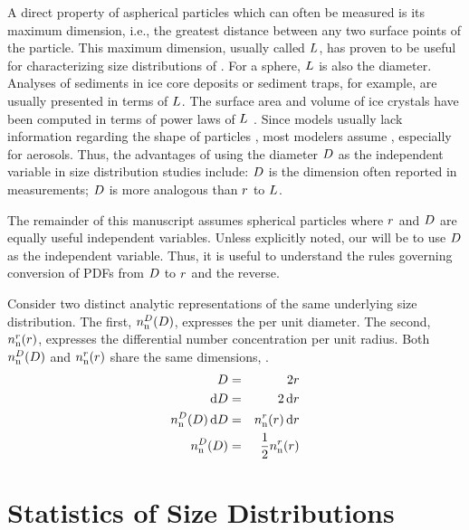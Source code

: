 \documentclass[12pt,twoside]{article}
\begin{document}
A direct property of aspherical particles which can often be measured
is its maximum dimension, i.e., the greatest distance between any two
surface points of the particle.
This maximum dimension, usually called $L$, has proven to be
useful for characterizing size distributions of 
. 
For a sphere, $L$ is also the diameter.
Analyses of  sediments in ice core deposits or sediment
traps, for example, are usually presented in terms of $L$.
The surface area and volume of ice crystals have been computed in terms
of power laws of $L$ \cite[e.g.,][]{HeP84,TaL95}.
Since models usually lack information regarding the shape of
particles \cite[early exceptions include][]{Zek941,ChL941}, most modelers
assume , especially for aerosols.
Thus, the advantages of using the diameter $D$ as the independent 
variable in size distribution studies include: $D$ is the
dimension often reported in measurements; $D$ is more analogous
than $r$ to $L$.

The remainder of this manuscript assumes spherical particles where
$r$ and $D$ are equally useful independent variables.
Unless explicitly noted, our  will be to use $D$
as the independent variable.
Thus, it is useful to understand the rules governing conversion of PDFs
from $D$ to $r$ and the reverse.

Consider two distinct analytic representations of the same underlying
size distribution.
The first, $n_{\mathrm{n}}^{D}(D)$, expresses the  per unit diameter.
The second, $n_{\mathrm{n}}^{r}(r)$, expresses the differential number
concentration per unit radius.
Both $n_{\mathrm{n}}^{D}(D)$ and $n_{\mathrm{n}}^{r}(r)$ share the same dimensions, 
\nbrxmCm. 
\begin{eqnarray}
D & = & 2r \\
\mathrm{d}D & = & 2 \,\mathrm{d}r \\
n_{\mathrm{n}}^{D}(D) \,\mathrm{d}D & = & n_{\mathrm{n}}^{r}(r) \,\mathrm{d}r \\
n_{\mathrm{n}}^{D}(D) & = & \frac{1}{2} n_{\mathrm{n}}^{r}(r)
\label{eqn:dmt_rds}
\end{eqnarray}

\section{Statistics of Size Distributions}\label{sxn:stt}
\end{document}
